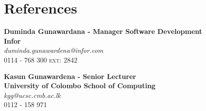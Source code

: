 \documentclass[letterpaper,11pt]{article}
\begin{document}
\vspace{1pt}
\section{References}
  \begin{multicols}{2}
    \textbf{Duminda Gunawardana - Manager Software Development}
      \\\textbf{\small{Infor}}
      \\\textit{duminda.gunawardena@infor.com}
      \\\textsc{0114 - 768 300 ext: 2842}

    \columnbreak

    \textbf{Kasun Gunawardena - Senior Lecturer}
      \\\textbf{\small{University of Colombo School of Computing}}
      \\\textit{kgg@ucsc.cmb.ac.lk}
      \\\textsc{0112 - 158 971}
      
  \end{multicols}
\end{document}
